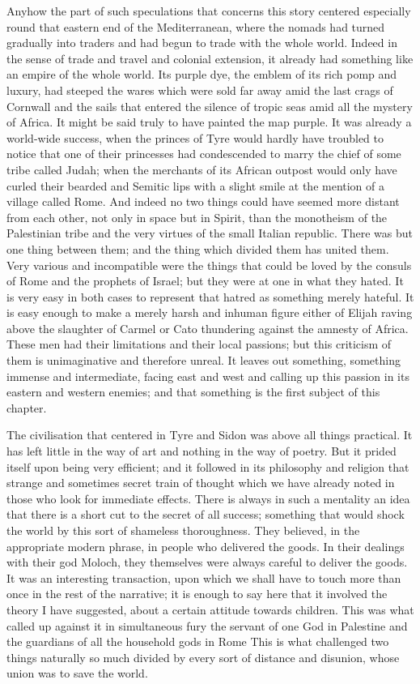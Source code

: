 Anyhow the part of such speculations that concerns this story centered especially round that eastern end of the Mediterranean, where the nomads had turned gradually into traders and had begun to trade with the whole world. Indeed in the sense of trade and travel and colonial extension, it already had something like an empire of the whole world. Its purple dye, the emblem of its rich pomp and luxury, had steeped the wares which were sold far away amid the last crags of Cornwall and the sails that entered the silence of tropic seas amid all the mystery of Africa. It might be said truly to have painted the map purple. It was already a world-wide success, when the princes of Tyre would hardly have troubled to notice that one of their princesses had condescended to marry the chief of some tribe called Judah; when the merchants of its African outpost would only have curled their bearded and Semitic lips with a slight smile at the mention of a village called Rome. And indeed no two things could have seemed more distant from each other, not only in space but in Spirit, than the monotheism of the Palestinian tribe and the very virtues of the small Italian republic. There was but one thing between them; and the thing which divided them has united them. Very various and incompatible were the things that could be loved by the consuls of Rome and the prophets of Israel; but they were at one in what they hated. It is very easy in both cases to represent that hatred as something merely hateful. It is easy enough to make a merely harsh and inhuman figure either of Elijah raving above the slaughter of Carmel or Cato thundering against the amnesty of Africa. These men had their limitations and their local passions; but this criticism of them is unimaginative and therefore unreal. It leaves out something, something immense and intermediate, facing east and west and calling up this passion in its eastern and western enemies; and that something is the first subject of this chapter.

The civilisation that centered in Tyre and Sidon was above all things practical. It has left little in the way of art and nothing in the way of poetry. But it prided itself upon being very efficient; and it followed in its philosophy and religion that strange and sometimes secret train of thought which we have already noted in those who look for immediate effects. There is always in such a mentality an idea that there is a short cut to the secret of all success; something that would shock the world by this sort of shameless thoroughness. They believed, in the appropriate modern phrase, in people who delivered the goods. In their dealings with their god Moloch, they themselves were always careful to deliver the goods. It was an interesting transaction, upon which we shall have to touch more than once in the rest of the narrative; it is enough to say here that it involved the theory I have suggested, about a certain attitude towards children. This was what called up against it in simultaneous fury the servant of one God in Palestine and the guardians of all the household gods in Rome This is what challenged two things naturally so much divided by every sort of distance and disunion, whose union was to save the world.

